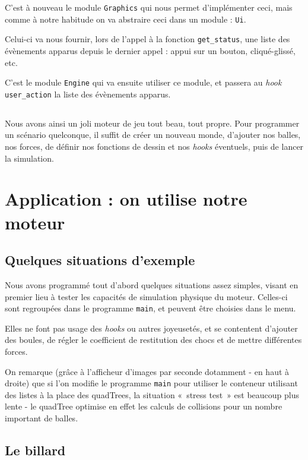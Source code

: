\documentclass[a4paper]{scrartcl}
\begin{document}
C'est à nouveau le module \texttt{Graphics} qui nous permet
d'implémenter ceci, mais comme à notre habitude on va abstraire ceci
dans un module : \texttt{Ui}.

Celui-ci va nous fournir, lors de l'appel à la fonction
\texttt{get\_status}, une liste des évènements apparus depuis le
dernier appel : appui sur un bouton, cliqué-glissé, etc.

C'est le module \texttt{Engine} qui va ensuite utiliser ce module, et
passera au \emph{hook} \texttt{user\_action} la liste des évènements
apparus.

\subsection*{}
Nous avons ainsi un joli moteur de jeu tout beau, tout propre. Pour
programmer un scénario quelconque, il suffit de créer un nouveau
monde, d'ajouter nos balles, nos forces, de définir nos fonctions de
dessin et nos \emph{hooks} éventuels, puis de lancer la simulation.


\section{Application : on utilise notre moteur}
\label{applications}

\subsection{Quelques situations d'exemple}

Nous avons programmé tout d'abord quelques situations assez simples,
visant en premier lieu à tester les capacités de simulation physique
du moteur. Celles-ci sont regroupées dans le programme \texttt{main},
et peuvent être choisies dans le menu.

Elles ne font pas usage des \emph{hooks} ou autres joyeusetés, et se
contentent d'ajouter des boules, de régler le coefficient de
restitution des chocs et de mettre différentes forces.

On remarque (grâce à l'afficheur d'images par seconde dotamment - en
haut à droite) que si l'on modifie le programme \texttt{main} pour
utiliser le conteneur utilisant des listes à la place des quadTrees,
la situation «~stress test~» est beaucoup plus lente - le quadTree
optimise en effet les calculs de collisions pour un nombre important
de balles.

\subsection{Le billard}
\end{document}
